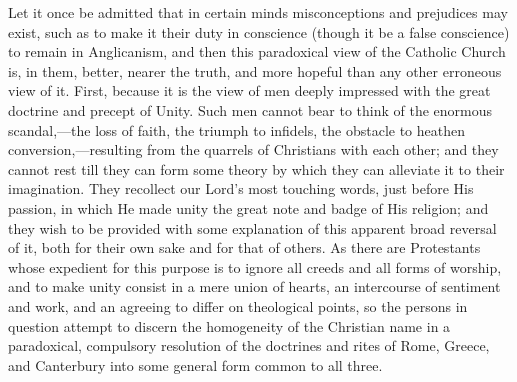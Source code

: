 Let it once be admitted that in certain minds
misconceptions and prejudices may exist, such as to make it their duty
in conscience (though it be a false conscience) to remain in
Anglicanism, and then this paradoxical view of the Catholic Church is,
in them, better, nearer the truth, and more hopeful than any
other erroneous view of it. First, because it is the view of men
deeply impressed with the great doctrine and precept of Unity. Such
men cannot bear to think of the enormous scandal,—the loss of faith,
the triumph to infidels, the obstacle to heathen
conversion,—resulting from the quarrels of Christians with each
other; and they cannot rest till they can form some theory by which
they can alleviate it to their imagination. They recollect our Lord's
most touching words, just before His passion, in which He made unity
the great note and badge of His religion; and they wish to be provided
with some explanation of this apparent broad reversal of it, both for
their own sake and for that of others. As there are Protestants whose
expedient for this purpose is to ignore all creeds and all forms of
worship, and to make unity consist in a mere union of hearts, an
intercourse of sentiment and work, and an agreeing to differ on
theological points, so the persons in question attempt to discern the
homogeneity of the Christian name in a paradoxical, compulsory
resolution of the doctrines and rites of Rome, Greece, and Canterbury
into some general form common to all three.

